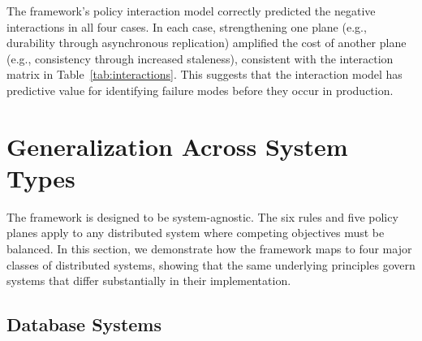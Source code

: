 \documentclass[conference]{IEEEtran}
\begin{document}
\begin{table}[t]
\caption{Rule Violations Across Case Studies}
\label{tab:case-studies}
\centering
{}
\end{table}

The framework's policy interaction model correctly predicted the negative interactions in all four cases. In each case, strengthening one plane (e.g., durability through asynchronous replication) amplified the cost of another plane (e.g., consistency through increased staleness), consistent with the interaction matrix in Table~\ref{tab:interactions}. This suggests that the interaction model has predictive value for identifying failure modes before they occur in production.

\section{Generalization Across System Types}

The framework is designed to be system-agnostic. The six rules and five policy planes apply to any distributed system where competing objectives must be balanced. In this section, we demonstrate how the framework maps to four major classes of distributed systems, showing that the same underlying principles govern systems that differ substantially in their implementation.

\subsection{Database Systems}
\end{document}
